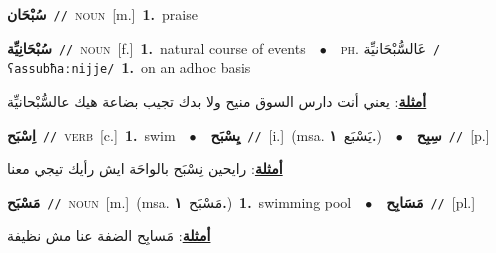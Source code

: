 \documentclass[10pt,a4paper,twoside]{article} %
\begin{document}
\begin{multicols}{2}
{{{{\setlength\topsep{0pt}\textbf{\foreignlanguage{arabic}{سُبْحَان}}\ {\color{gray}\texttt{//}\color{black}}\ \textsc{noun}\ [m.]\ \textbf{1.}~praise\ 

{\setlength\topsep{0pt}\textbf{\foreignlanguage{arabic}{سُبْحَانِيِّة}}\ {\color{gray}\texttt{//}\color{black}}\ \textsc{noun}\ [f.]\ \textbf{1.}~natural course of events\ \ $\bullet$\ \ \textsc{ph.} \color{gray} \foreignlanguage{arabic}{عَالسُّبْحَانيِّة}\color{black}\ {\color{gray}\texttt{/{\sffamily ʕassubħaːnijje}/}\color{black}}\ \textbf{1.}~on an adhoc basis\  \begin{flushright}\color{gray}\foreignlanguage{arabic}{\textbf{\underline{\foreignlanguage{arabic}{أمثلة}}}: يعني أنت دارس السوق منيح ولا بدك تجيب بضاعة هيك عالسُّبْحانيِّة}\end{flushright}\color{black}} \vspace{2mm}

{\setlength\topsep{0pt}\textbf{\foreignlanguage{arabic}{اِسْبَح}}\ {\color{gray}\texttt{//}\color{black}}\ \textsc{verb}\ [c.]\ \textbf{1.}~swim\ \ $\bullet$\ \ \setlength\topsep{0pt}\textbf{\foreignlanguage{arabic}{يِسْبَح}}\ {\color{gray}\texttt{//}\color{black}}\ [i.]\ \color{gray}(msa. \foreignlanguage{arabic}{يَسْبَع}~\foreignlanguage{arabic}{\textbf{١.}})\color{black}\ \ $\bullet$\ \ \setlength\topsep{0pt}\textbf{\foreignlanguage{arabic}{سِبِح}}\ {\color{gray}\texttt{//}\color{black}}\ [p.]\  \begin{flushright}\color{gray}\foreignlanguage{arabic}{\textbf{\underline{\foreignlanguage{arabic}{أمثلة}}}: رايحين نِسْبَح بالواحَة ايش رأيك تيجي معنا}\end{flushright}\color{black}} \vspace{2mm}

{\setlength\topsep{0pt}\textbf{\foreignlanguage{arabic}{مَسْبَح}}\ {\color{gray}\texttt{//}\color{black}}\ \textsc{noun}\ [m.]\ \color{gray}(msa. \foreignlanguage{arabic}{مَسْبَح}~\foreignlanguage{arabic}{\textbf{١.}})\color{black}\ \textbf{1.}~swimming pool\ \ $\bullet$\ \ \setlength\topsep{0pt}\textbf{\foreignlanguage{arabic}{مَسَابِح}}\ {\color{gray}\texttt{//}\color{black}}\ [pl.]\  \begin{flushright}\color{gray}\foreignlanguage{arabic}{\textbf{\underline{\foreignlanguage{arabic}{أمثلة}}}: مَسابِح الضفة عنا مش نظيفة}\end{flushright}\color{black}} \vspace{2mm}

}}}}
\end{multicols}
\end{document}
